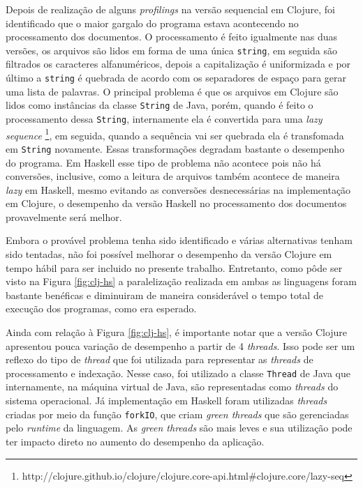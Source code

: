 Depois de realização de alguns \emph{profilings} na versão sequencial em Clojure, foi identificado que o maior gargalo do programa estava acontecendo no processamento dos documentos. O processamento é feito igualmente nas duas versões, os arquivos são lidos em forma de uma única \verb|string|, em seguida são filtrados os caracteres alfanuméricos, depois a capitalização é uniformizada e por último a \verb|string| é quebrada de acordo com os separadores de espaço para gerar uma lista de palavras. O principal problema é que os arquivos em Clojure são lidos como instâncias da classe \verb|String| de Java, porém, quando é feito o processamento dessa \verb|String|, internamente ela é convertida para uma \emph{lazy sequence} \footnote{http://clojure.github.io/clojure/clojure.core-api.html\#clojure.core/lazy-seq}, em seguida, quando a sequência vai ser quebrada ela é transfomada em \verb|String| novamente. Essas transformações degradam bastante o desempenho do programa. Em Haskell esse tipo de problema não acontece pois não há conversões, inclusive, como a leitura de arquivos também acontece de maneira \emph{lazy} em Haskell, mesmo evitando as conversões desnecessárias na implementação em Clojure, o desempenho da versão Haskell no processamento dos documentos provavelmente será melhor.

Embora o provável problema tenha sido identificado e várias alternativas tenham sido tentadas, não foi possível melhorar o desempenho da versão Clojure em tempo hábil para ser incluido no presente trabalho. Entretanto, como pôde ser visto na Figura \ref{fig:clj-hs} a paralelização realizada em ambas as linguagens foram bastante benéficas e diminuiram de maneira considerável o tempo total de execução dos programas, como era esperado.

Ainda com relação à Figura \ref{fig:clj-hs}, é importante notar que a versão Clojure apresentou pouca variação de desempenho a partir de 4 \emph{threads}. Isso pode ser um reflexo do tipo de \emph{thread} que foi utilizada para representar as \emph{threads} de processamento e indexação. Nesse caso, foi utilizado a classe \verb|Thread| de Java que internamente, na máquina virtual de Java, são representadas como \emph{threads} do sistema operacional. Já implementação em Haskell foram utilizadas \emph{threads} criadas por meio da função \verb|forkIO|, que criam \emph{green threads} que são gerenciadas pelo \emph{runtime} da linguagem. As \emph{green threads} são mais leves e sua utilização pode ter impacto direto no aumento do desempenho da aplicação.